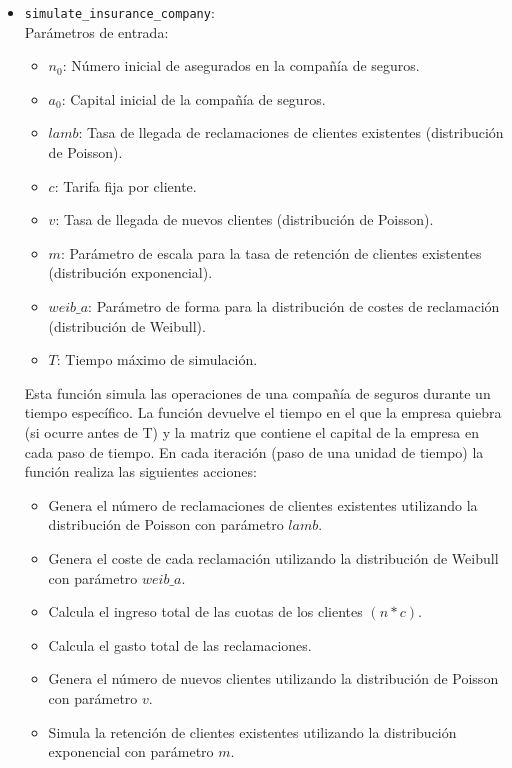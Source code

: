 \documentclass{article}
\begin{document}
 \begin{itemize}
    \item \texttt{simulate\_insurance\_company}: \\
        Parámetros de entrada:
        \begin{itemize}
            \item $n_0$: Número inicial de asegurados en la compañía de seguros.
            \item $a_0$: Capital inicial de la compañía de seguros.
            \item $lamb$: Tasa de llegada de reclamaciones de clientes existentes (distribución de Poisson).
            \item $c$: Tarifa fija por cliente. 
            \item $v$: Tasa de llegada de nuevos clientes (distribución de Poisson).
            \item $m$: Parámetro de escala para la tasa de retención de clientes existentes (distribución exponencial).
            \item $weib\_a$: Parámetro de forma para la distribución de costes de reclamación (distribución de Weibull).
            \item $T$: Tiempo máximo de simulación.
        \end{itemize}
        Esta función simula las operaciones de una compañía de seguros durante un tiempo específico. La función devuelve el tiempo en el que la empresa quiebra (si ocurre antes de T) y la matriz que contiene el capital de la empresa en cada paso de tiempo.
        En cada iteración (paso de una unidad de tiempo) la función realiza las siguientes acciones:
        \begin{itemize}
            \item Genera el número de reclamaciones de clientes existentes utilizando la distribución de Poisson con parámetro $lamb$.
            \item Genera el coste de cada reclamación utilizando la distribución de Weibull con parámetro $weib\_a$.
            \item Calcula el ingreso total de las cuotas de los clientes $(n * c)$.
            \item Calcula el gasto total de las reclamaciones.
            \item Genera el número de nuevos clientes utilizando la distribución de Poisson con parámetro $v$.
            \item Simula la retención de clientes existentes utilizando la distribución exponencial con parámetro $m$.

\end{itemize}
\end{itemize}
\end{document}
